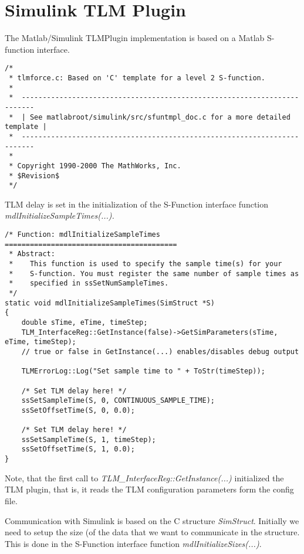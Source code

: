 \chapter{Simulink TLM Plugin}

The Matlab/Simulink TLMPlugin implementation is based on a Matlab S-function interface.

{\scriptsize
\begin{verbatim}
/*
 * tlmforce.c: Based on 'C' template for a level 2 S-function.
 *
 *  -------------------------------------------------------------------------
 *  | See matlabroot/simulink/src/sfuntmpl_doc.c for a more detailed template |
 *  -------------------------------------------------------------------------
 *
 * Copyright 1990-2000 The MathWorks, Inc.
 * $Revision$
 */
\end{verbatim}
}

TLM delay is set in the initialization of the S-Function interface function {\em mdlInitializeSampleTimes(...).}

{\scriptsize
\begin{verbatim}
/* Function: mdlInitializeSampleTimes =========================================
 * Abstract:
 *    This function is used to specify the sample time(s) for your
 *    S-function. You must register the same number of sample times as
 *    specified in ssSetNumSampleTimes.
 */
static void mdlInitializeSampleTimes(SimStruct *S)
{
    double sTime, eTime, timeStep;
    TLM_InterfaceReg::GetInstance(false)->GetSimParameters(sTime, eTime, timeStep);
    // true or false in GetInstance(...) enables/disables debug output

    TLMErrorLog::Log("Set sample time to " + ToStr(timeStep));

    /* Set TLM delay here! */
    ssSetSampleTime(S, 0, CONTINUOUS_SAMPLE_TIME);
    ssSetOffsetTime(S, 0, 0.0);

    /* Set TLM delay here! */
    ssSetSampleTime(S, 1, timeStep);
    ssSetOffsetTime(S, 1, 0.0);
}
\end{verbatim}
}

Note, that the first call to {\em TLM\_InterfaceReg::GetInstance(...)} initialized the TLM plugin, that is, it reads the TLM configuration parameters form the config file.

Communication with Simulink is based on the C structure {\em SimStruct}. 
Initially we need to setup the size (of the data that we want to communicate in the structure. 
This is done in the S-Function interface function {\em mdlInitializeSizes(...)}.

